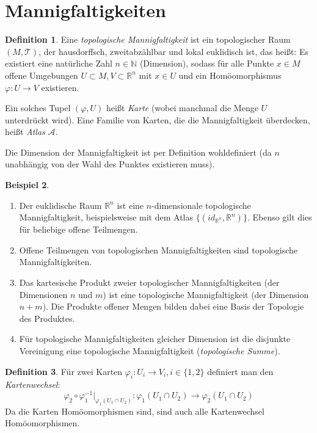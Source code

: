 \documentclass[a4paper]{scrreprt}
\numberwithin{equation}{chapter}
\newcommand{\R}{\mathbb{R}}
\theoremstyle{definition}
\newtheorem{defn}{Definition}[section]
\newtheorem{bsp}[defn]{Beispiel}
\begin{document}
	\section{Mannigfaltigkeiten}
		\begin{defn}
			Eine \emph{topologische Mannigfaltigkeit} ist ein topologischer Raum $(M,\mathcal{T})$, der hausdorffsch, zweitabzählbar und lokal euklidisch ist, das heißt:
			Es existiert eine natürliche Zahl $n\in \mathbb{N}$ (Dimension), sodass für alle Punkte $x\in M$ offene Umgebungen $U\subset M, V\subset \R^n$ mit $x\in U $ und ein Homöomorphismus $ \varphi\colon U\rightarrow V$ existieren.

			Ein solches Tupel $(\varphi,U)$ heißt \emph{Karte} (wobei manchmal die Menge $U$ unterdrückt wird). Eine Familie von Karten, die die Mannigfaltigkeit überdecken, heißt \emph{Atlas} $\mathcal{A}$.

			Die Dimension der Mannigfaltigkeit ist per Definition wohldefiniert (da $n$ unabhängig von der Wahl des Punktes existieren muss).
		\end{defn}
		\begin{bsp}\hfill 
			\begin{enumerate}
				\item Der euklidische Raum $\R^n$ ist eine $n$-dimensionale topologische Mannigfaltigkeit, beispielsweise mit dem Atlas $\lbrace (id_{\R^n},\R^n)\rbrace$. Ebenso gilt dies für beliebige offene Teilmengen.
				\item Offene Teilmengen von topologischen Mannigfaltigkeiten sind topologische Mannigfaltigkeiten.
				\item Das kartesische Produkt zweier topologischer Mannigfaltigkeiten (der Dimensionen $n$ und $m$) ist eine topologische Mannigfaltigkeit (der Dimension $n + m$). Die Produkte offener Mengen bilden dabei eine Basis der Topologie des Produktes.
				\item Für topologische Mannigfaltigkeiten gleicher Dimension ist die disjunkte Vereinigung eine topologische Mannigfaltigkeit (\emph{topologische Summe}).
			\end{enumerate}
		\end{bsp}
		\begin{defn}
			Für zwei Karten $\varphi_i\colon U_i\rightarrow V_i, i\in\lbrace 1,2 \rbrace$ definiert man den \emph{Kartenwechsel}:
			\begin{equation*}
				\varphi_2\circ\varphi_1^{-1}\vert_{\varphi_1(U_1\cap U_2)}\colon \varphi_1(U_1\cap U_2)\rightarrow \varphi_2(U_1\cap U_2)
			\end{equation*}
			Da die Karten Homöomorphismen sind, sind auch alle Kartenwechsel Homöomorphismen.
		\end{defn} 
\end{document}
